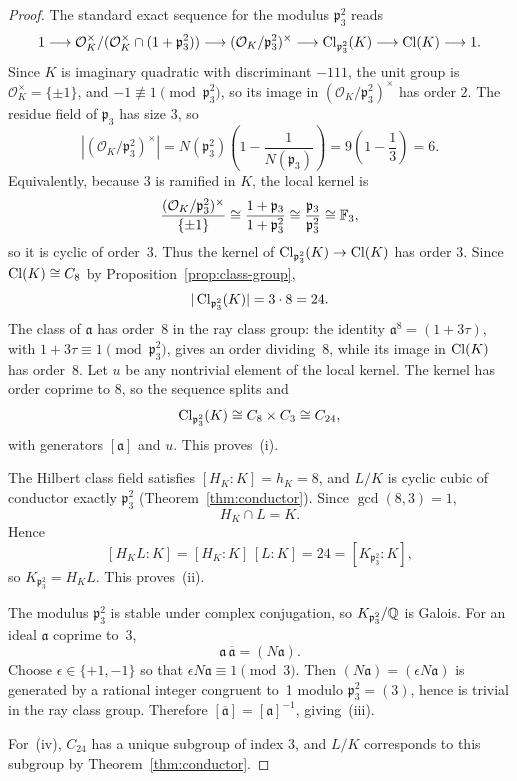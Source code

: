 \begin{proof}
The standard exact sequence for the modulus \(\mathfrak p_3^2\) reads \cite[Ch.~VI]{Neukirch1999}
\[
1\longrightarrow \mathcal O_K^\times/(\mathcal O_K^\times\cap (1+\mathfrak p_3^2))
\longrightarrow (\mathcal O_K/\mathfrak p_3^2)^\times
\longrightarrow \operatorname{Cl}_{\mathfrak p_3^2}(K)
\longrightarrow \operatorname{Cl}(K)\longrightarrow 1.
\]
Since \(K\) is imaginary quadratic with discriminant \(-111\), the unit group is \(\mathcal O_K^\times=\{\pm 1\}\), and \(-1\not\equiv 1\pmod{\mathfrak p_3^2}\), so its image in \((\mathcal O_K/\mathfrak p_3^2)^\times\) has order \(2\). The residue field of \(\mathfrak p_3\) has size \(3\), so
\[
|(\mathcal O_K/\mathfrak p_3^2)^\times|
=N(\mathfrak p_3^2)\left(1-\frac{1}{N(\mathfrak p_3)}\right)
=9\left(1-\frac13\right)
=6.
\]
Equivalently, because \(3\) is ramified in \(K\), the local kernel is
\[
\frac{(\mathcal O_K/\mathfrak p_3^2)^\times}{\{\pm1\}}
\cong \frac{1+\mathfrak p_3}{1+\mathfrak p_3^2}
\cong \frac{\mathfrak p_3}{\mathfrak p_3^2}
\cong \mathbb{F}_3,
\]
so it is cyclic of order~\(3\). Thus the kernel of \(\operatorname{Cl}_{\mathfrak p_3^2}(K)\to \operatorname{Cl}(K)\) has order \(3\). Since \(\operatorname{Cl}(K)\cong C_8\) by Proposition~\ref{prop:class-group},
\[
|\operatorname{Cl}_{\mathfrak p_3^2}(K)|=3\cdot 8=24.
\]
The class of \(\mathfrak a\) has order~\(8\) in the ray class group: the identity \(\mathfrak a^8=(1+3\tau)\), with \(1+3\tau\equiv1\pmod{\mathfrak p_3^2}\), gives an order dividing~\(8\), while its image in \(\operatorname{Cl}(K)\) has order~\(8\). Let \(u\) be any nontrivial element of the local kernel. The kernel has order coprime to \(8\), so the sequence splits and
\[
\operatorname{Cl}_{\mathfrak p_3^2}(K)\cong C_8\times C_3\cong C_{24},
\]
with generators \([\mathfrak a]\) and \(u\). This proves~(i).

The Hilbert class field satisfies \([H_K:K]=h_K=8\), and \(L/K\) is cyclic cubic of conductor exactly \(\mathfrak p_3^2\) (Theorem~\ref{thm:conductor}). Since \(\gcd(8,3)=1\),
\[
H_K\cap L=K.
\]
Hence
\[
[H_KL:K]=[H_K:K]\,[L:K]=24=[K_{\mathfrak p_3^2}:K],
\]
so \(K_{\mathfrak p_3^2}=H_KL\). This proves~(ii).

The modulus \(\mathfrak p_3^2\) is stable under complex conjugation, so \(K_{\mathfrak p_3^2}/\mathbb{Q}\) is Galois. For an ideal \(\mathfrak a\) coprime to~3,
\[
\mathfrak a\,\overline{\mathfrak a}=(N\mathfrak a).
\]
Choose \(\epsilon\in\{+1,-1\}\) so that \(\epsilon N\mathfrak a\equiv1\pmod{3}\). Then \((N\mathfrak a)=(\epsilon N\mathfrak a)\) is generated by a rational integer congruent to~1 modulo \(\mathfrak p_3^2=(3)\), hence is trivial in the ray class group. Therefore \([\overline{\mathfrak a}]=[\mathfrak a]^{-1}\), giving~(iii).

For~(iv), \(C_{24}\) has a unique subgroup of index \(3\), and \(L/K\) corresponds to this subgroup by Theorem~\ref{thm:conductor}.
\end{proof}

